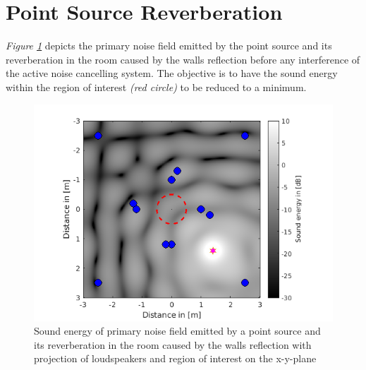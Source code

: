 \section{Point Source Reverberation}
\textit{Figure \ref{fig:reverberation}} depicts the primary noise field emitted by the point source and its reverberation in the room caused by the walls reflection before any interference of the active noise cancelling system. The objective is to have the sound energy within the region of interest \textit{(red circle)} to be reduced to a minimum.

\begin{figure}[H]
    \centerline{\includegraphics[width=\textwidth]{LaTeX/images/plots/Point_source_reverberation.png}}
    \caption{Sound energy of primary noise field emitted by a point source and its reverberation in the room caused by the walls reflection with projection of loudspeakers and region of interest on the x-y-plane}
    \label{fig:reverberation}
\end{figure}

